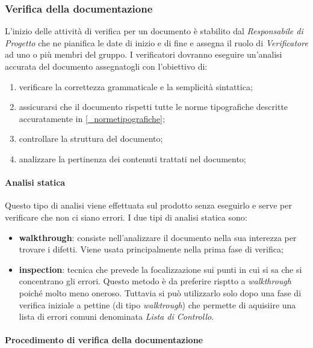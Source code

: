 \subsubsection{Verifica della documentazione}
L'inizio delle attività di verifica per un documento è stabilito dal \textit{Responsabile di Progetto} che ne pianifica le date di inizio e di fine e assegna il ruolo di \textit{Verificatore} ad uno o più membri del gruppo. I verificatori dovranno eseguire un'analisi accurata del documento assegnatogli con l'obiettivo di:
\begin{enumerate}
    \item verificare la correttezza grammaticale e la semplicità sintattica;
    \item assicurarsi che il documento rispetti tutte le norme tipografiche descritte accuratamente in \ref{_normetipografiche};
    \item controllare la struttura del documento;
    \item analizzare la pertinenza dei contenuti trattati nel documento;
\end{enumerate}

\paragraph{Analisi statica}
Questo tipo di analisi viene effettuata sul prodotto senza eseguirlo e serve per verificare che non ci siano errori. I due tipi di analisi statica sono:
\begin{itemize}
    \item \textbf{walkthrough}: consiste nell'analizzare il documento nella sua interezza per trovare i difetti. Viene usata principalmente nella prima fase di verifica;
    \item \textbf{inspection}: tecnica che prevede la focalizzazione sui punti in cui si sa che si concentrano gli errori. Questo metodo è da preferire risptto a \textit{walkthrough} poiché molto meno oneroso. Tuttavia si può utilizzarlo solo dopo una fase di verifica iniziale a pettine (di tipo \textit{walktrough}) che permette di aquisiire una lista di errori comuni denominata \textit{Lista di Controllo}. 
\end{itemize}

\paragraph{Procedimento di verifica della documentazione}

